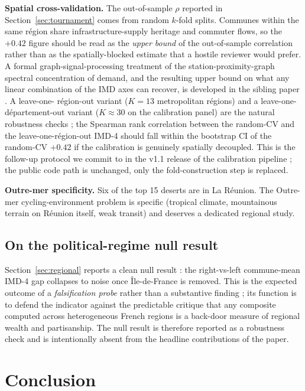 \documentclass[11pt,a4paper]{article}
\begin{document}
\textbf{Spatial cross-validation.}  The out-of-sample $\rho$
reported in Section~\ref{sec:tournament} comes from random
$k$-fold splits.  Communes within the same r\'egion share
infrastructure-supply heritage and commuter flows, so the
$+0.42$ figure should be read as the \emph{upper bound} of the
out-of-sample correlation rather than as the spatially-blocked
estimate that a hostile reviewer would prefer.  A formal
graph-signal-processing treatment of the
station-proximity-graph spectral concentration of demand, and
the resulting upper bound on what any linear combination of the
IMD axes can recover, is developed in the sibling paper
\citet{FossePallares2026gsp}.  A leave-one-
r\'egion-out variant ($K = 13$ metropolitan r\'egions) and a
leave-one-d\'epartement-out variant ($K \approx 30$ on the
calibration panel) \citep{Roberts2017,Pohjankukka2017} are the
natural robustness checks ; the Spearman rank correlation
between the random-CV and the leave-one-r\'egion-out IMD-4
should fall within the bootstrap CI of the random-CV $+0.42$ if
the calibration is genuinely spatially decoupled.  This is the
follow-up protocol we commit to in the v1.1 release of the
calibration pipeline ; the public code path is unchanged, only
the fold-construction step is replaced.

\textbf{Outre-mer specificity.}  Six of the top 15 deserts are in
La R\'eunion.  The Outre-mer cycling-environment problem is
specific (tropical climate, mountainous terrain on R\'eunion
itself, weak transit) and deserves a dedicated regional study.

\subsection{On the political-regime null result}

Section~\ref{sec:regional} reports a clean null result : the
right-vs-left commune-mean IMD-4 gap collapses to noise once
\^Ile-de-France is removed.  This is the expected outcome of a
\emph{falsification probe} rather than a substantive finding ;
its function is to defend the indicator against the
predictable critique that any composite computed across
heterogeneous French regions is a back-door measure of regional
wealth and partisanship.  The null result is therefore reported
as a robustness check and is intentionally absent from the
headline contributions of the paper.

\section{Conclusion}
\label{sec:conclusion}
\end{document}
